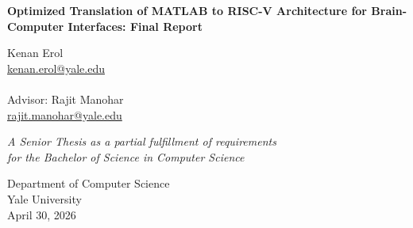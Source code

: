 \begin{titlepage}
    \begin{center}
        \vspace*{1cm}
        
        \huge
        \textbf{Optimized Translation of MATLAB to RISC-V Architecture for Brain-Computer Interfaces: Final Report}
        
        \vspace{0.5cm}
        \LARGE
        
        \vspace{1cm}

        \Large
        Kenan Erol\\
        \href{first.last@yale.edu}{kenan.erol@yale.edu}\\~\\
        Advisor: Rajit Manohar\\
        \href{first.last2@yale.edu}{rajit.manohar@yale.edu}
        
        \vfill
        
        \textit{A Senior Thesis as a partial fulfillment
        of requirements \\for the Bachelor of Science in Computer Science}
        
        \vspace{0.8cm}
        
        \Large
        Department of Computer Science\\
        Yale University\\
        April 30, 2026
        
    \end{center}
\end{titlepage}